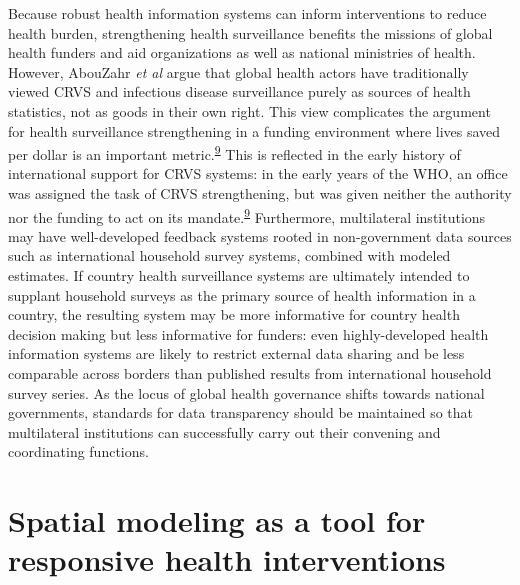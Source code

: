 \documentclass[
]{article}
\begin{document}
Because robust health information systems can inform interventions to reduce health burden, strengthening health surveillance benefits the missions of global health funders and aid organizations as well as national ministries of health. However, AbouZahr \emph{et al} argue that global health actors have traditionally viewed CRVS and infectious disease surveillance purely as sources of health statistics, not as goods in their own right. This view complicates the argument for health surveillance strengthening in a funding environment where lives saved per dollar is an important metric.\textsuperscript{\protect\hyperlink{ref-AbouZahr2015}{9}} This is reflected in the early history of international support for CRVS systems: in the early years of the WHO, an office was assigned the task of CRVS strengthening, but was given neither the authority nor the funding to act on its mandate.\textsuperscript{\protect\hyperlink{ref-AbouZahr2015}{9}} Furthermore, multilateral institutions may have well-developed feedback systems rooted in non-government data sources such as international household survey systems, combined with modeled estimates. If country health surveillance systems are ultimately intended to supplant household surveys as the primary source of health information in a country, the resulting system may be more informative for country health decision making but less informative for funders: even highly-developed health information systems are likely to restrict external data sharing and be less comparable across borders than published results from international household survey series. As the locus of global health governance shifts towards national governments, standards for data transparency should be maintained so that multilateral institutions can successfully carry out their convening and coordinating functions.

\hypertarget{spatial-modeling-as-a-tool-for-responsive-health-interventions}{%
\section{Spatial modeling as a tool for responsive health interventions}\label{spatial-modeling-as-a-tool-for-responsive-health-interventions}}
\end{document}

